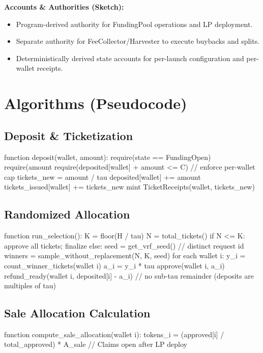 \documentclass[10pt,twocolumn]{article}
\begin{document}
\textbf{Accounts \& Authorities (Sketch):}
\begin{itemize}
  \item Program-derived authority for FundingPool operations and LP deployment.
  \item Separate authority for FeeCollector/Harvester to execute buybacks and splits.
  \item Deterministically derived state accounts for per-launch configuration and per-wallet receipts.
\end{itemize}

\section*{Algorithms (Pseudocode)}

\subsection*{Deposit \& Ticketization}
\begin{code}
function deposit(wallet, amount):
  require(state == FundingOpen)
  require(amount %
  require(deposited[wallet] + amount <= C)  // enforce per-wallet cap
  tickets_new = amount / tau
  deposited[wallet] += amount
  tickets_issued[wallet] += tickets_new
  mint TicketReceipts(wallet, tickets_new)
\end{code}

\subsection*{Randomized Allocation}
\begin{code}
function run_selection():
  K = floor(H / tau)
  N = total_tickets()
  if N <= K:
    approve all tickets; finalize
  else:
    seed = get_vrf_seed()    // distinct request id
    winners = sample_without_replacement(N, K, seed)
    for each wallet i:
      y_i = count_winner_tickets(wallet i)
      a_i = y_i * tau
      approve(wallet i, a_i)
      refund_ready(wallet i, deposited[i] - a_i)  // no sub-tau remainder (deposits are multiples of tau)
\end{code}

\subsection*{Sale Allocation Calculation}
\begin{code}
function compute_sale_allocation(wallet i):
  tokens_i = (approved[i] / total_approved) * A_sale
  // Claims open after LP deploy
\end{code}
\end{document}
